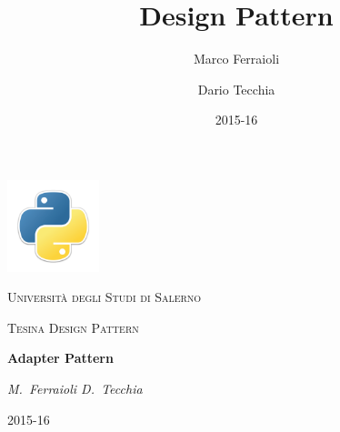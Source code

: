 \documentclass[a4paper, 12pt, oneside]{book}
\author{Marco Ferraioli \and Dario Tecchia}
\title{Design Pattern}
\date{2015-16}
\begin{document}
  \begin{titlepage}
    \centering
    \includegraphics[width=0.20\textwidth]{img/python-logo.png}\par\vspace{1cm}
    {\scshape\LARGE Università degli Studi di Salerno \par}
    \vspace{1cm}
    {\scshape\Large Tesina Design Pattern\par}
    \vspace{1.5cm}
    {\huge\bfseries Adapter Pattern\par}
    \vspace{2cm}
    {\Large\itshape M.~Ferraioli D.~Tecchia\par}
    \vfill

    \vfill

    {\large 2015-16\par}
  \end{titlepage}

  \tableofcontents
  
  
    
  
  
  
    
\end{document}
